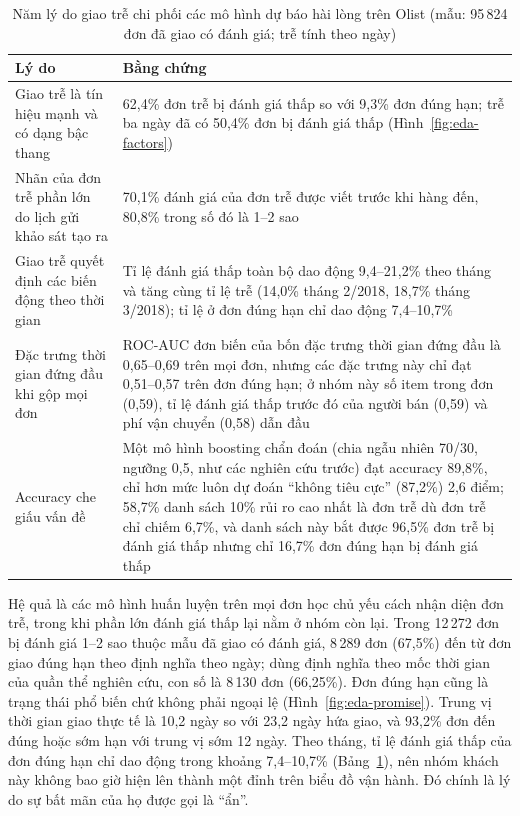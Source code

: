 \begin{table}[htbp]\centering\small
\caption{Năm lý do giao trễ chi phối các mô hình dự báo hài lòng trên Olist (mẫu: 95\,824 đơn đã giao có đánh giá; trễ tính theo ngày)}\label{tab:eda-reasons}
\begin{tabular}{p{4.3cm}p{9.2cm}}
\toprule
Lý do & Bằng chứng \\
\midrule
Giao trễ là tín hiệu mạnh và có dạng bậc thang & 62,4\% đơn trễ bị đánh giá thấp so với 9,3\% đơn đúng hạn; trễ ba ngày đã có 50,4\% đơn bị đánh giá thấp (Hình~\ref{fig:eda-factors}) \\
Nhãn của đơn trễ phần lớn do lịch gửi khảo sát tạo ra & 70,1\% đánh giá của đơn trễ được viết trước khi hàng đến, 80,8\% trong số đó là 1--2 sao \\
Giao trễ quyết định các biến động theo thời gian & Tỉ lệ đánh giá thấp toàn bộ dao động 9,4--21,2\% theo tháng và tăng cùng tỉ lệ trễ (14,0\% tháng 2/2018, 18,7\% tháng 3/2018); tỉ lệ ở đơn đúng hạn chỉ dao động 7,4--10,7\% \\
Đặc trưng thời gian đứng đầu khi gộp mọi đơn & ROC-AUC đơn biến của bốn đặc trưng thời gian đứng đầu là 0,65--0,69 trên mọi đơn, nhưng các đặc trưng này chỉ đạt 0,51--0,57 trên đơn đúng hạn; ở nhóm này số item trong đơn (0,59), tỉ lệ đánh giá thấp trước đó của người bán (0,59) và phí vận chuyển (0,58) dẫn đầu \\
Accuracy che giấu vấn đề & Một mô hình boosting chẩn đoán (chia ngẫu nhiên 70/30, ngưỡng 0,5, như các nghiên cứu trước) đạt accuracy 89,8\%, chỉ hơn mức luôn dự đoán ``không tiêu cực'' (87,2\%) 2,6 điểm; 58,7\% danh sách 10\% rủi ro cao nhất là đơn trễ dù đơn trễ chỉ chiếm 6,7\%, và danh sách này bắt được 96,5\% đơn trễ bị đánh giá thấp nhưng chỉ 16,7\% đơn đúng hạn bị đánh giá thấp \\
\bottomrule
\end{tabular}
\end{table}

Hệ quả là các mô hình huấn luyện trên mọi đơn học chủ yếu cách nhận diện đơn trễ, trong khi phần lớn đánh giá thấp lại nằm ở nhóm còn lại. Trong 12\,272 đơn bị đánh giá 1--2 sao thuộc mẫu đã giao có đánh giá, 8\,289 đơn (67,5\%) đến từ đơn giao đúng hạn theo định nghĩa theo ngày; dùng định nghĩa theo mốc thời gian của quần thể nghiên cứu, con số là 8\,130 đơn (66,25\%). Đơn đúng hạn cũng là trạng thái phổ biến chứ không phải ngoại lệ (Hình~\ref{fig:eda-promise}). Trung vị thời gian giao thực tế là 10,2 ngày so với 23,2 ngày hứa giao, và 93,2\% đơn đến đúng hoặc sớm hạn với trung vị sớm 12 ngày. Theo tháng, tỉ lệ đánh giá thấp của đơn đúng hạn chỉ dao động trong khoảng 7,4--10,7\% (Bảng~\ref{tab:eda-reasons}), nên nhóm khách này không bao giờ hiện lên thành một đỉnh trên biểu đồ vận hành. Đó chính là lý do sự bất mãn của họ được gọi là ``ẩn''.

